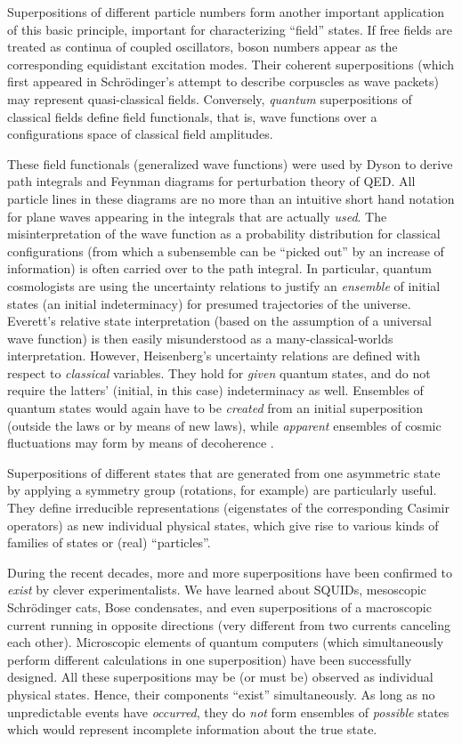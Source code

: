 \documentclass[12pt]{article}
\begin{document}
Superpositions of different particle numbers form another important
application of this basic principle, important for characterizing
``field'' states. If free fields are treated as continua of coupled
oscillators, boson numbers appear as the corresponding equidistant
excitation modes. Their coherent superpositions (which first appeared
in Schr\"odinger's attempt to describe corpuscles as wave packets) may
represent quasi-classical fields. Conversely, {\it quantum}
superpositions of classical fields define field functionals, that is,
wave functions over a configurations space of classical field
amplitudes.

These field functionals (generalized wave functions) were used
by Dyson \cite{Dyson} to derive path integrals and Feynman
diagrams for perturbation theory of QED. All particle lines in these
diagrams are no more than an intuitive short hand notation for plane
waves appearing in the integrals that are actually {\it used}. The
misinterpretation of the wave function as a probability distribution
for classical configurations (from which a subensemble can be ``picked
out'' by an increase of information) is often carried over to the
path integral. In particular, quantum cosmologists are
using the uncertainty relations to justify an {\it ensemble}
of initial states (an initial indeterminacy) for presumed trajectories
of the universe. Everett's relative state interpretation (based on the
assumption of a universal wave function) is then easily
misunderstood as a many-classical-worlds interpretation. However,
Heisenberg's uncertainty relations are defined with respect to {\it
classical} variables. They hold for {\it given} quantum states, and
do not require the latters' (initial, in this case) indeterminacy as
well.  Ensembles of quantum states would again have to be {\it
created} from an initial superposition (outside the laws or by means
of new laws), while {\it apparent} ensembles of cosmic fluctuations may
form by means of decoherence
\cite{K+Polarski}.

Superpositions of different states that are
generated from one asymmetric state by applying a symmetry group
(rotations, for example) are particularly useful. They
define irreducible representations (eigenstates of the corresponding
Casimir operators) as new individual physical states, which give rise
to various kinds of families of states or (real)
``particles''.

During the recent decades, more and more superpositions have
been confirmed to {\it exist} by clever experimentalists. We
have learned about SQUIDs, mesoscopic Schr\"odinger cats, Bose
condensates, and even superpositions of a macroscopic current running
in opposite directions (very different from two currents canceling
each other). Microscopic elements of quantum computers (which
simultaneously perform different calculations in one superposition)
have been successfully designed. All these superpositions may be (or
must be) observed as individual physical states. Hence, their
components  ``exist'' simultaneously. As
long as no unpredictable events have {\it occurred}, they
do {\it not} form ensembles of {\it possible} states which would
represent incomplete information about the true state.
\end{document}
